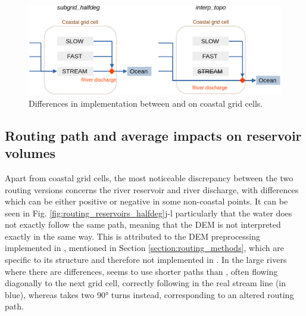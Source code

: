 
\begin{figure}[htbp]
    \centering
    \includegraphics[width=\textwidth]{images/chap3/coastal_routing_behaviour_v3.png
}
    \caption{Differences in implementation between \std and \native on coastal grid cells.}
    \label{fig:coastal_routing_behaviour}
\end{figure}

\subsection{Routing path and average impacts on reservoir volumes}
Apart from coastal grid cells, the most noticeable discrepancy between the two routing versions concerns the river reservoir and river discharge, with differences which can be either positive or negative in some non-coastal points. It can be seen in Fig. \ref{fig:routing_reservoirs_halfdeg}j-l particularly that the water does not exactly follow the same path, meaning that the DEM is not interpreted exactly in the same way. 
This is attributed to the DEM preprocessing implemented in \std, mentioned in Section \ref{section:routing_methods}, which are specific to its structure and therefore not implemented in \native. In the large rivers where there are differences, \native seems to use shorter paths than \std, often flowing diagonally to the next grid cell, correctly following in the real stream line (in blue), whereas \std takes two 90° turns instead, corresponding to an altered routing path. 

